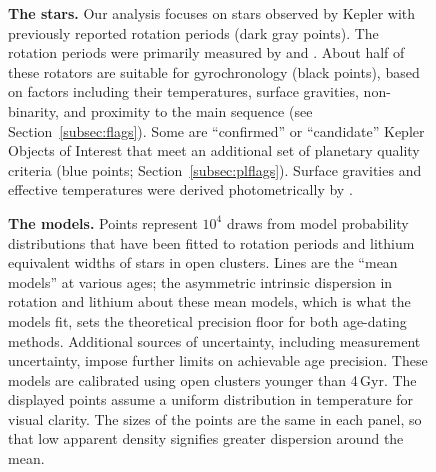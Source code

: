 \documentclass[11pt,twocolumn,tighten]{aastex63}
\begin{document}
\begin{figure}[!t]
  \begin{center}
  \end{center}
  \vspace{-0.5cm}
  \caption{
    {\bf The stars.}  Our analysis focuses on stars observed by Kepler
    with previously reported rotation periods (dark gray points).
    The rotation periods were primarily measured by \citet{Santos_2019} and \citet{Santos_2021}.
    About half of these rotators are suitable for gyrochronology
    (black points), based on factors including their temperatures,
    surface gravities, non-binarity, and proximity to the main
    sequence (see Section~\ref{subsec:flags}).   Some are
    ``confirmed'' or ``candidate'' Kepler Objects of Interest that
    meet an additional set of planetary quality criteria (blue points;
    Section~\ref{subsec:plflags}).  Surface gravities and effective
    temperatures were derived photometrically by \citet{Berger_2020a_catalog}.
  }
  \label{fig:stellarprops}
\end{figure}

\begin{figure}[!t]
  \begin{center}
    \leavevmode
  \end{center}
  \vspace{-0.6cm}
  \caption{
    {\bf The models.}
    Points represent $10^4$ draws from model probability distributions
    that have been fitted to rotation periods
    \citep{Bouma_2023} and lithium equivalent widths
    \citep[EWs;][]{Jeffries_2023} of stars in open clusters.  Lines
    are the ``mean models'' at various ages; the asymmetric intrinsic
    dispersion in rotation and lithium about these mean models, which
    is what the models fit, sets the theoretical precision floor for
    both age-dating methods.    Additional sources of uncertainty,
    including measurement uncertainty, impose further limits on
    achievable age precision.  These models are calibrated using open
    clusters younger than 4\,Gyr.  The displayed points assume a
    uniform distribution in temperature for visual clarity.  The sizes
    of the points are the same in each panel, so that low apparent
    density signifies greater dispersion around the mean.
    \label{fig:models}
  }
\end{figure}
\end{document}
